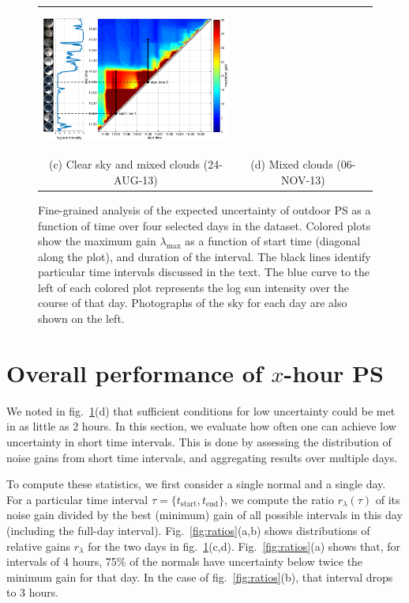 \begin{figure}[!th]
\begin{tabular}{cc}
\includegraphics[height=4.7cm]{./figures/events/events-20131106-colorbar.pdf} \\
(c) Clear sky and mixed clouds (24-AUG-13) & (d) Mixed clouds (06-NOV-13)
\end{tabular}
\vspace{.25em}
\caption[Fine-grained analysis of PS uncertainty]{Fine-grained analysis of the expected uncertainty of outdoor PS as a function of time over four selected days in the dataset. Colored plots show the maximum gain $\lambda_\text{max}$ as a function of start time (diagonal along the plot), and duration of the interval. The black lines identify particular time intervals discussed in the text. The blue curve to the left of each colored plot represents the log sun intensity over the course of that day. Photographs of the sky for each day are also shown on the left.}
\label{fig:events}
\end{figure}

\section{Overall performance of $x$-hour PS}  

We noted in fig.~\ref{fig:events}(d) that sufficient conditions for low uncertainty could be met in as little as 2 hours. In this section, we evaluate how often one can achieve low uncertainty in short time intervals. This is done by assessing the distribution of noise gains from short time intervals, and aggregating results over multiple days.

To compute these statistics, we first consider a single normal and a single day. For a particular time interval \mbox{$\tau = \{t_\text{start}, t_\text{end}\}$}, we compute the ratio $r_\lambda(\tau)$ of its noise gain divided by the best (minimum) gain of all possible intervals in this day (including the full-day interval). Fig.~\ref{fig:ratios}(a,b) shows distributions of relative gains $r_\lambda$ for the two days in fig.~\ref{fig:events}(c,d). Fig.~\ref{fig:ratios}(a) shows that, for intervals of 4 hours, 75\% of the normals have uncertainty below twice the minimum gain for that day. In the case of fig.~\ref{fig:ratios}(b), that interval drops to 3 hours. 

